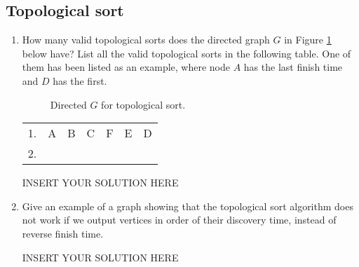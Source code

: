 \subsection{Topological sort}
\begin{enumerate}
    \item How many valid topological sorts does the directed graph $G$ in Figure \ref{fig:topo-sort} below have? List all the valid topological sorts in the following table. One of them has been listed as an example, where node $A$ has the last finish time and $D$ has the first.

    \begin{figure}[H]
        \centering
        \caption{Directed $G$ for topological sort.}
        \label{fig:topo-sort}
    \end{figure}
    
     \begin{center}
    \begin{tabular}{c c c c c c c}
    \hline
     1. & A & B & C & F & E & D\\
     2. &  &  &  &  &  & \\
    \hline
    \end{tabular}
    \label{table:q3}
    \end{center}
\begin{solution}   INSERT YOUR SOLUTION HERE   \end{solution}
    

    \item 
    Give an example of a graph showing that the topological sort algorithm does not work if we output vertices in order of their discovery time, instead of reverse finish time.

\begin{solution}   INSERT YOUR SOLUTION HERE   \end{solution}
\end{enumerate}
\newpage
